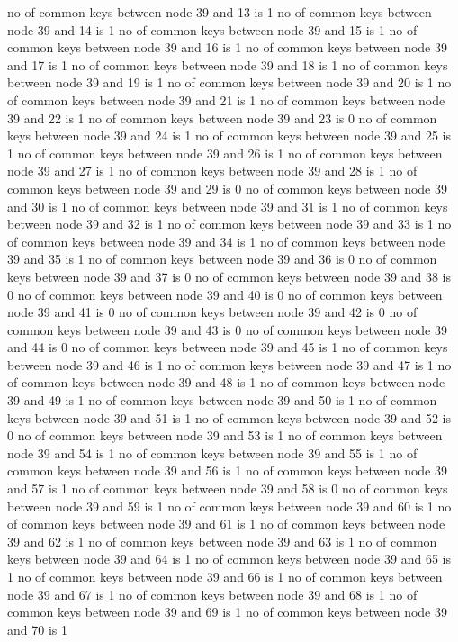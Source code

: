no of common keys between node 39 and 13 is 1
no of common keys between node 39 and 14 is 1
no of common keys between node 39 and 15 is 1
no of common keys between node 39 and 16 is 1
no of common keys between node 39 and 17 is 1
no of common keys between node 39 and 18 is 1
no of common keys between node 39 and 19 is 1
no of common keys between node 39 and 20 is 1
no of common keys between node 39 and 21 is 1
no of common keys between node 39 and 22 is 1
no of common keys between node 39 and 23 is 0
no of common keys between node 39 and 24 is 1
no of common keys between node 39 and 25 is 1
no of common keys between node 39 and 26 is 1
no of common keys between node 39 and 27 is 1
no of common keys between node 39 and 28 is 1
no of common keys between node 39 and 29 is 0
no of common keys between node 39 and 30 is 1
no of common keys between node 39 and 31 is 1
no of common keys between node 39 and 32 is 1
no of common keys between node 39 and 33 is 1
no of common keys between node 39 and 34 is 1
no of common keys between node 39 and 35 is 1
no of common keys between node 39 and 36 is 0
no of common keys between node 39 and 37 is 0
no of common keys between node 39 and 38 is 0
no of common keys between node 39 and 40 is 0
no of common keys between node 39 and 41 is 0
no of common keys between node 39 and 42 is 0
no of common keys between node 39 and 43 is 0
no of common keys between node 39 and 44 is 0
no of common keys between node 39 and 45 is 1
no of common keys between node 39 and 46 is 1
no of common keys between node 39 and 47 is 1
no of common keys between node 39 and 48 is 1
no of common keys between node 39 and 49 is 1
no of common keys between node 39 and 50 is 1
no of common keys between node 39 and 51 is 1
no of common keys between node 39 and 52 is 0
no of common keys between node 39 and 53 is 1
no of common keys between node 39 and 54 is 1
no of common keys between node 39 and 55 is 1
no of common keys between node 39 and 56 is 1
no of common keys between node 39 and 57 is 1
no of common keys between node 39 and 58 is 0
no of common keys between node 39 and 59 is 1
no of common keys between node 39 and 60 is 1
no of common keys between node 39 and 61 is 1
no of common keys between node 39 and 62 is 1
no of common keys between node 39 and 63 is 1
no of common keys between node 39 and 64 is 1
no of common keys between node 39 and 65 is 1
no of common keys between node 39 and 66 is 1
no of common keys between node 39 and 67 is 1
no of common keys between node 39 and 68 is 1
no of common keys between node 39 and 69 is 1
no of common keys between node 39 and 70 is 1
